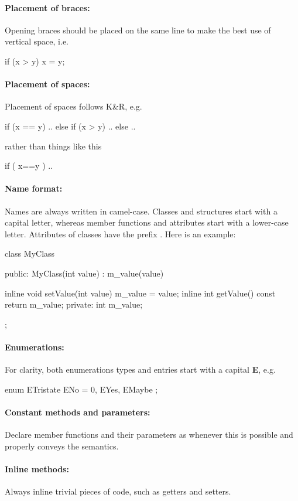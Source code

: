 \paragraph{Placement of braces:} Opening braces should be placed on the
same line to make the best use of vertical space, i.e.
\begin{cpp}
if (x > y) {
	x = y;
}
\end{cpp}

\paragraph{Placement of spaces:} Placement of spaces follows K\&R, e.g.
\begin{cpp}
if (x == y) {
	..
} else if (x > y) {
	..
} else {
	..
}
\end{cpp}
rather than things like this
\begin{cpp}
if ( x==y ){
}
..
\end{cpp}

\paragraph{Name format:} Names are always written in camel-case.
Classes and structures start with a capital letter, whereas member functions
and attributes start with a lower-case letter. Attributes of classes
have the prefix . Here is an example:
\begin{cpp}
class MyClass {
public:
	MyClass(int value) : m_value(value) { }

	inline void setValue(int value) { m_value = value; }
	inline int getValue() const { return m_value; }
private:
	int m_value;
};
\end{cpp}

\paragraph{Enumerations:} For clarity, both enumerations types and entries
start with a capital \textbf{E}, e.g.
\begin{cpp}
enum ETristate {
	ENo = 0,
	EYes,
	EMaybe
};
\end{cpp}
\paragraph{Constant methods and parameters:} Declare member functions and
their parameters as  whenever this is possible
and properly conveys the semantics.
\paragraph{Inline methods:} Always inline trivial pieces of code, such
as getters and setters.

